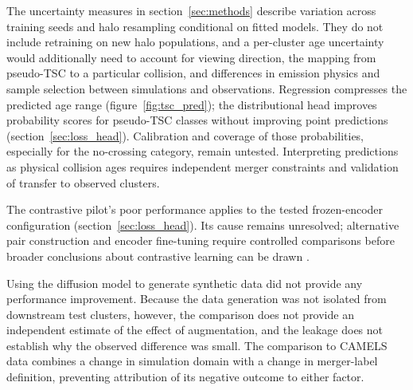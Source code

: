 The uncertainty measures in section~\ref{sec:methods} describe variation across training seeds and halo resampling conditional on fitted models.
They do not include retraining on new halo populations, and a per-cluster age uncertainty would additionally need to account for viewing direction, the mapping from pseudo-TSC to a particular collision, and differences in emission physics and sample selection between simulations and observations.
Regression compresses the predicted age range (figure~\ref{fig:tsc_pred}); the distributional head improves probability scores for pseudo-TSC classes without improving point predictions (section~\ref{sec:loss_head}).
Calibration and coverage of those probabilities, especially for the no-crossing category, remain untested.
Interpreting predictions as physical collision ages requires independent merger constraints and validation of transfer to observed clusters.

The contrastive pilot's poor performance applies to the tested frozen-encoder configuration (section~\ref{sec:loss_head}).
Its cause remains unresolved; alternative pair construction and encoder fine-tuning require controlled comparisons before broader conclusions about contrastive learning can be drawn \citep{Chadayammuri2026}.

Using the diffusion model to generate synthetic data did not provide any performance improvement.
Because the data generation was not isolated from downstream test clusters, however, the comparison does not provide an independent estimate of the effect of augmentation, and the leakage does not establish why the observed difference was small.
The comparison to CAMELS data combines a change in simulation domain with a change in merger-label definition, preventing attribution of its negative outcome to either factor.


